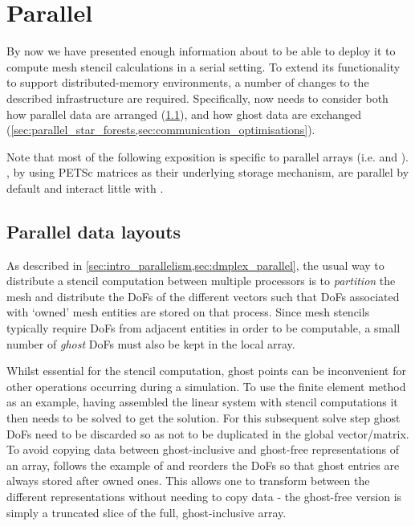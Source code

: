 \documentclass[thesis]{subfiles}
\begin{document}
\chapter{Parallel}
\label{chapter:parallel}

By now we have presented enough information about  to be able to deploy it to compute mesh stencil calculations in a serial setting.
To extend its functionality to support distributed-memory environments, a number of changes to the described infrastructure are required.
Specifically,  now needs to consider both how parallel data are arranged (\cref{sec:parallel_data_layouts}), and how ghost data are exchanged (\cref{sec:parallel_star_forests,sec:communication_optimisations}).

Note that most of the following exposition is specific to parallel arrays (i.e.  and ).
, by using PETSc matrices as their underlying storage mechanism, are parallel by default and interact little with .

\section{Parallel data layouts}
\label{sec:parallel_data_layouts}

As described in \cref{sec:intro_parallelism,sec:dmplex_parallel}, the usual way to distribute a stencil computation between multiple processors is to \emph{partition} the mesh and distribute the DoFs of the different vectors such that DoFs associated with `owned' mesh entities are stored on that process.
Since mesh stencils typically require DoFs from adjacent entities in order to be computable, a small number of \emph{ghost} DoFs must also be kept in the local array.

Whilst essential for the stencil computation, ghost points can be inconvenient for other operations occurring during a simulation.
To use the finite element method as an example, having assembled the linear system with stencil computations it then needs to be solved to get the solution.
For this subsequent solve step ghost DoFs need to be discarded so as not to be duplicated in the global vector/matrix.
To avoid copying data between ghost-inclusive and ghost-free representations of an array,  follows the example of  and reorders the DoFs so that ghost entries are always stored after owned ones.
This allows one to transform between the different representations without needing to copy data - the ghost-free version is simply a truncated slice of the full, ghost-inclusive array.
\end{document}
